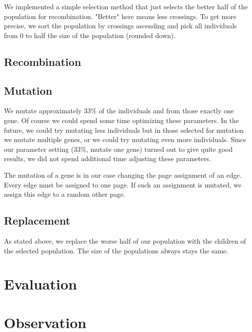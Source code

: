 \documentclass [11pt]{article}
\begin{document}
We implemented a simple selection method that just selects the better half of the population for recombination. "Better" here means less crossings. To get more precise, we sort the population by crossings ascending and pick all individuals from 0 to half the size of the population (rounded down).

\subsection{Recombination}



\subsection{Mutation}

We mutate approximately 33\% of the individuals and from those exactly one gene. Of course we could spend some time optimizing these parameters. In the future, we could try mutating less individuals but in those selected for mutation we mutate multiple genes, or we could try mutating even more individuals. Since our parameter setting (33\%, mutate one gene) turned out to give quite good results, we did not spend additional time adjusting these parameters.

The mutation of a gene is in our case changing the page assignment of an edge. Every edge must be assigned to one page. If such an assignment is mutated, we assign this edge to a random other page.

\subsection{Replacement}

As stated above, we replace the worse half of our population with the children of the selected population. The size of the populations always stays the same.

\section{Evaluation}

\section{Observation}
\end{document}
